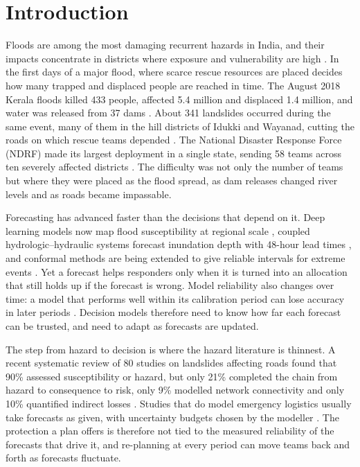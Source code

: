 \documentclass[pdflatex,sn-basic]{sn-jnl}
\theoremstyle{plain}%
\theoremstyle{remark}%
\theoremstyle{definition}%
\begin{document}
\section{Introduction}\label{sec:intro}

Floods are among the most damaging recurrent hazards in India, and their impacts concentrate in districts where exposure and vulnerability are high \citep{Saharia2025,Jain2025}. In the first days of a major flood, where scarce rescue resources are placed decides how many trapped and displaced people are reached in time. The August 2018 Kerala floods killed 433 people, affected 5.4 million and displaced 1.4 million, and water was released from 37 dams \citep{PDNA2018}. About 341 landslides occurred during the same event, many of them in the hill districts of Idukki and Wayanad, cutting the roads on which rescue teams depended \citep{PDNA2018}. The National Disaster Response Force (NDRF) made its largest deployment in a single state, sending 58 teams across ten severely affected districts \citep{NDRF2018}. The difficulty was not only the number of teams but where they were placed as the flood spread, as dam releases changed river levels and as roads became impassable.

Forecasting has advanced faster than the decisions that depend on it. Deep learning models now map flood susceptibility at regional scale \citep{Rachit2026}, coupled hydrologic--hydraulic systems forecast inundation depth with 48-hour lead times \citep{Rao2024}, and conformal methods are being extended to give reliable intervals for extreme events \citep{Pasche2026}. Yet a forecast helps responders only when it is turned into an allocation that still holds up if the forecast is wrong. Model reliability also changes over time: a model that performs well within its calibration period can lose accuracy in later periods \citep{Xiao2026}. Decision models therefore need to know how far each forecast can be trusted, and need to adapt as forecasts are updated.

The step from hazard to decision is where the hazard literature is thinnest. A recent systematic review of 80 studies on landslides affecting roads found that 90\% assessed susceptibility or hazard, but only 21\% completed the chain from hazard to consequence to risk, only 9\% modelled network connectivity and only 10\% quantified indirect losses \citep{Vega2026}. Studies that do model emergency logistics usually take forecasts as given, with uncertainty budgets chosen by the modeller \citep{Caunhye2012,Zhang2023}. The protection a plan offers is therefore not tied to the measured reliability of the forecasts that drive it, and re-planning at every period can move teams back and forth as forecasts fluctuate.
\end{document}
